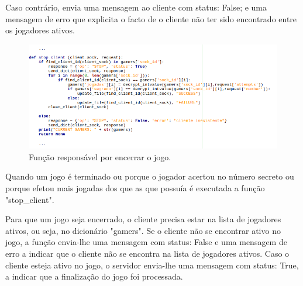 \documentclass{report}
\begin{document}
Caso contrário, envia uma mensagem ao cliente com status: False; e uma mensagem de erro que explicita o facto de o cliente não ter sido encontrado entre os jogadores ativos.

\begin{figure}[H]
        \centering
        \includegraphics[scale=0.65]{stop_client}       
        \caption{Função responsável por encerrar o jogo.}
\end{figure}
Quando um jogo é terminado ou porque o jogador acertou no número secreto ou porque efetou mais jogadas dos que as que possuía é executada a função "stop\_client".

Para que um jogo seja encerrado, o cliente precisa estar na lista de jogadores ativos, ou seja, no dicionário "gamers".
Se o cliente não se encontrar ativo no jogo, a função envia-lhe uma mensagem com status: False e uma mensagem de erro a indicar que o cliente não se encontra na lista de jogadores ativos.
Caso o cliente esteja ativo no jogo, o servidor envia-lhe uma mensagem com status: True, a indicar que a finalização do jogo foi processada.
\end{document}
